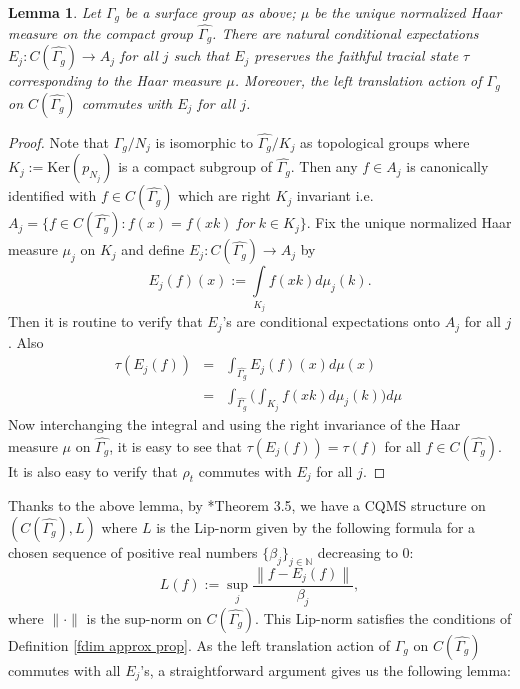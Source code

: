 \documentclass[a4paper,11pt,reqno]{amsart}
\theoremstyle{plain}
\newtheorem{lem}[thm]{Lemma}
\theoremstyle{mainthmstyle}
\theoremstyle{named}
\numberwithin{equation}{section}
\newcommand{\Bea}{\begin{eqnarray*}}
\newcommand{\Eea}{\end{eqnarray*}}
\begin{document}
\begin{lem}
    Let $\Gamma_g$ be a surface group as above; $\mu$ be the unique normalized Haar measure on the compact group $\widehat{\Gamma_g}$. There are natural conditional expectations $E_{j}:C(\widehat{\Gamma_g})\rightarrow A_{j}$ for all $j$ such that $E_{j}$ preserves the faithful tracial state $\tau$ corresponding to the Haar measure $\mu$. Moreover, the left translation action of $\Gamma_g$ on $C(\widehat{\Gamma_g})$ commutes with $E_j$ for all $j$.
\end{lem}
\begin{proof}
 Note that $\Gamma_g/N_{j}$ is isomorphic to $\widehat{\Gamma_g}/K_{j}$ as topological groups where $K_{j}:=\mathrm{Ker}(p_{N_j})$ is a compact subgroup of $\widehat{\Gamma_g}$. Then any $f\in A_j$ is canonically identified with $f\in C(\widehat{\Gamma_g})$ which are right $K_{j}$ invariant i.e. $A_{j}=\{f\in C(\widehat{\Gamma_g}):f(x)=f(xk) \ for \ k\in K_j\}$. Fix the unique normalized Haar measure $\mu_j$ on $K_{j}$ and define $E_j:C(\widehat{\Gamma_g})\rightarrow A_{j}$ by
 \begin{displaymath}
     E_j(f)(x):=\int\limits_{K_j}f(xk)d\mu_j(k).
 \end{displaymath}
 Then it is routine to verify that $E_j$'s are conditional expectations onto $A_j$ for all $j$. Also 
 \Bea
 \tau(E_j(f))&=&\int_{\widehat{\Gamma_g}}E_{j}(f)(x)d\mu(x)\\
 &=& \int_{\widehat{\Gamma_g}}\Big(\int_{K_j}f(xk)d\mu_{j}(k)\Big)d\mu\
\Eea
Now interchanging the integral and using the right invariance of the Haar measure $\mu$ on $\widehat{\Gamma_g}$, it is easy to see that $\tau(E_j(f))=\tau(f)$ for all $f\in C(\widehat{\Gamma_g})$. It is also easy to verify that $\rho_t$ commutes with $E_{j}$ for all $j$.
 
\end{proof}
Thanks to the above lemma, by \cite{Agui-Latre-AF}*{Theorem 3.5}, we have a CQMS structure on $(C(\widehat{\Gamma_g}),L)$ where $L$ is the Lip-norm given by the following formula for a chosen sequence of positive real numbers $\{\beta_j\}_{j\in\mathbb{N}}$ decreasing to $0$:
\begin{equation}\label{lip1}
   L(f):=\sup\limits_j\frac{\left \| f-E_{j}(f) \right \|}{\beta_j},  
\end{equation}
where $\|\cdot\|$ is the sup-norm on $C(\widehat{\Gamma_g})$. This Lip-norm satisfies the conditions of Definition \ref{fdim approx prop}. As the left translation action of $\Gamma_g$ on $C(\widehat{\Gamma_g})$ commutes with all $E_{j}$'s, a straightforward argument gives us the following lemma:
\end{document}
